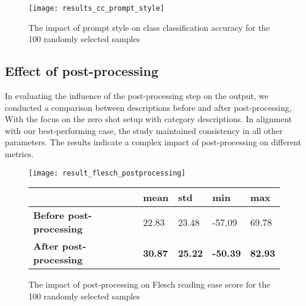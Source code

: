 \begin{figure}[H]
	\centering
	\texttt{[image: results\_cc\_prompt\_style]}
	\caption{The impact of prompt style on class classification accuracy for the 100 randomly selected samples}
	\label{fig:results_cc_prompt_style}
\end{figure}

\subsection{Effect of post-processing}\label{post-processing}

In evaluating the influence of the post-processing step on the output, we conducted a comparison between descriptions before and after post-processing, With the focus on the zero shot setup with category descriptions. In alignment with our best-performing case, the study maintained consistency in all other parameters. The results indicate a complex impact of post-processing on different metrics.


%

\begin{figure}[H]
	\centering
	\texttt{[image: result\_flesch\_postprocessing]}
	\begin{tabular}{|l|l|l|l|l|}
		\hline
		\textbf{} & \textbf{mean} & \textbf{std} & \textbf{min} & \textbf{max} \\ \hline
		\textbf{Before post-processing} & 22.83 & 23.48 & -57.09 & 69.78 \\ \hline
		\textbf{After post-processing } & \textbf{30.87}  & \textbf{25.22}  & \textbf{-50.39}  & \textbf{82.93} \\ \hline
	\end{tabular}
	\captionsetup{labelformat=andtable}
	\caption{The impact of post-processing on Flesch reading ease score for the 100 randomly selected samples}
	\label{fig:result_flesch_postprocessing}
\end{figure}


